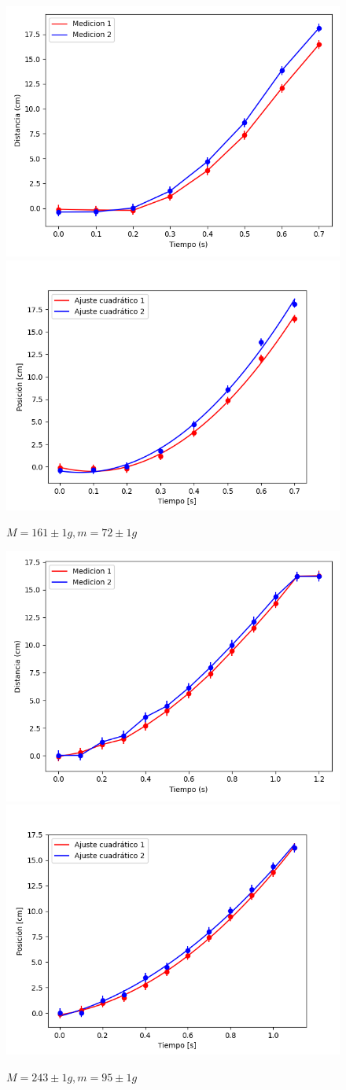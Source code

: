 \documentclass[12pt,a4]{article}
\begin{document}
\begin{figure}[H]
    \centering
    \includegraphics[width=0.4\linewidth]{TiempoVsDistanciaPisoMadera2PB_O.png}
    \includegraphics[width=0.44\linewidth]{ajuste2_PisoMadera2PB_O.png}
    \caption{$M = 161 \pm 1 g, m = 72 \pm 1 g$}
    \label{fig:2PB_O piso trineo}

\end{figure}

\begin{figure}[H]
    \centering
    \includegraphics[width=0.4\linewidth]{TiempoVsDistanciaPisoMaderaMPB_O.png}
    \includegraphics[width=0.44\linewidth]{ajuste2_PisoMaderaMPB_O.png}
    \caption{$M = 243 \pm 1 g, m = 95 \pm 1 g$}
    \label{fig:M_OP piso trineo}
\end{figure}
\end{document}
